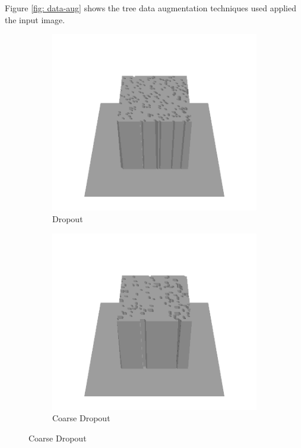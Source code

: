 \documentclass[../document.tex]{subfiles}
\begin{document}
Figure \ref{fig: data-aug} shows the tree data augmentation techniques used applied the input image.
\begin{figure}[htbp]
    \centering
        \begin{subfigure}[b]{0.32\textwidth}
            \includegraphics[width=\textwidth]{../img/data-aug/3d/center-dropout-mayavi.png}
            \caption{Dropout}
        \end{subfigure}
        \begin{subfigure}[b]{0.32\linewidth}
            \includegraphics[width=\textwidth]{../img/data-aug/3d/center-coarse-dropout-mayavi.png}
            \caption{Coarse Dropout}
            \end{subfigure}    


\end{figure}
\end{document}
